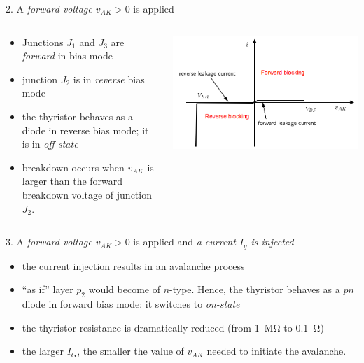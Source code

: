 \begin{frame}{2. A \textit{forward voltage $v_{AK}>0$} is applied}
    
\begin{columns}
\begin{column}{0.45\linewidth}
\begin{itemize}
    \item Junctions $J_1$ and $J_3$ are \textit{forward} in bias mode
    \item junction $J_2$ is in \textit{reverse} bias mode
    \item the thyristor behaves as a diode in reverse bias mode; it is in \textit{off-state}
    \item breakdown occurs when $v_{AK}$ is larger than the forward breakdown voltage of junction $J_2$.
\end{itemize}
\end{column}
\begin{column}{0.55\linewidth}
\begin{center}
    \includegraphics[width=0.99\linewidth]{images/thyristor3.png}
\end{center}
\end{column}
\end{columns}
\end{frame}

\begin{frame}{3. A \textit{forward voltage $v_{AK}>0$} is applied and \textit{a current $I_g$ is injected}}
\begin{itemize}
    \item the current injection results in an avalanche process
    \item ``as if'' layer $p_2$ would become of $n$-type. Hence, the thyristor behaves as a $pn$ diode in forward bias mode: it switches to \textit{on-state}
    \item the thyristor resistance is dramatically reduced (from \SI{1}{\mega\ohm} to \SI{0.1}{\ohm})
    \item the larger $I_G$, the smaller the value of $v_{AK}$ needed to initiate the avalanche.
\end{itemize}
\end{frame}

